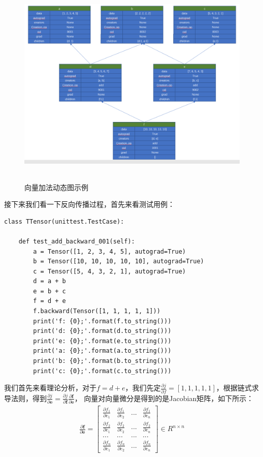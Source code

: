 \begin{figure}[h]
	\caption{向量加法动态图示例}
	\label{p000016}
	\centering
	\includegraphics[height=10cm]{images/p000016}
\end{figure}
接下来我们看一下反向传播过程，首先来看测试用例：
\begin{lstlisting}
class TTensor(unittest.TestCase):

	def test_add_backward_001(self):
		a = Tensor([1, 2, 3, 4, 5], autograd=True)
		b = Tensor([10, 10, 10, 10, 10], autograd=True)
		c = Tensor([5, 4, 3, 2, 1], autograd=True)
		d = a + b
		e = b + c
		f = d + e
		f.backward(Tensor([1, 1, 1, 1, 1]))
		print('f: {0};'.format(f.to_string()))
		print('d: {0};'.format(d.to_string()))
		print('e: {0};'.format(e.to_string()))
		print('a: {0};'.format(a.to_string()))
		print('b: {0};'.format(b.to_string()))
		print('c: {0};'.format(c.to_string()))
\end{lstlisting}
我们首先来看理论分析，对于$f=d+e $，我们先定$\frac{\partial j}{\partial f}=[1, 1, 1, 1, 1]$，根据链式求导法则，得到$\frac{\partial j}{\partial \boldsymbol{e}}=\frac{\partial j}{\partial \boldsymbol{f}} \frac{\partial \boldsymbol{f}}{\partial \boldsymbol{e}}$，
向量对向量微分是得到的是Jacobian矩阵，如下所示：
\begin{equation}
\begin{aligned}
\frac{\partial \boldsymbol{f}}{\partial \boldsymbol{e}} = \begin{bmatrix}
\frac{\partial f_{1}}{\partial e_{1}} & \frac{\partial f_{1}}{\partial e_{2}} & ... & \frac{\partial f_{1}}{\partial e_{n}} \\
\frac{\partial f_{2}}{\partial e_{1}} & \frac{\partial f_{2}}{\partial e_{2}} & ... & \frac{\partial f_{2}}{\partial e_{n}} \\
... & ... & ... & ... \\
\frac{\partial f_{n}}{\partial e_{1}} & \frac{\partial f_{n}}{\partial e_{2}} & ... & \frac{\partial f_{n}}{\partial e_{n}}
\end{bmatrix} \in R^{n \times n}
\end{aligned}
\label{chpZ01-vector-vector-gradient}
\end{equation}
